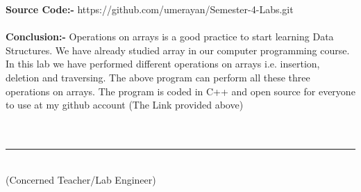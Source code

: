 \documentclass[11pt]{article}            %
\newcommand\tab[1][1cm]{\hspace*{#1}}
\begin{document}
\textbf{Source Code:-}
https://github.com/umerayan/Semester-4-Labs.git\\~\\

\textbf{Conclusion:-}
Operations on arrays is a good practice to start learning Data Structures. We have already studied array in our computer programming course. In this lab we have performed different operations on arrays i.e. insertion, deletion and traversing. The above program can perform all these three operations on arrays. The program is coded in C++ and open source for everyone to use at my github account (The Link provided above) \\~\\~\\

\tab[6cm] \noindent\rule{6cm}{0.4pt}\\
\tab[6cm] (Concerned Teacher/Lab Engineer)
 
\end{document}
